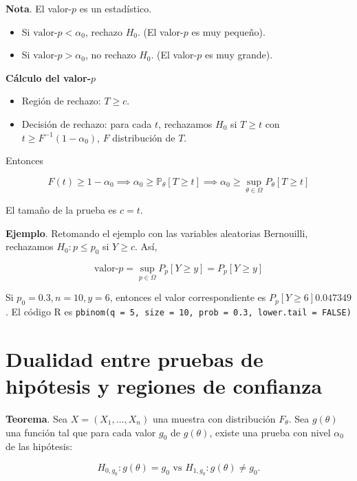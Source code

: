 \documentclass[
  12pt,
]{book}
\begin{document}
\textbf{Nota}. El valor-\(p\) es un estadístico.

\begin{itemize}
\item
  Si \(\text{valor-}p<\alpha_0\), rechazo \(H_0\). (El valor-\(p\) es muy pequeño).
\item
  Si \(\text{valor-}p>\alpha_0\), no rechazo \(H_0\). (El valor-\(p\) es muy grande).
\end{itemize}

\textbf{Cálculo del valor-\(p\)}

\begin{itemize}
\item
  Región de rechazo: \(T\geq c\).
\item
  Decisión de rechazo: para cada \(t\), rechazamos \(H_0\) si \(T\geq t\) con \(t\geq F^{-1}(1-\alpha_0)\), \(F\) distribución de \(T\).
\end{itemize}

Entonces

\[F(t) \geq 1-\alpha_0 \implies \alpha_0 \geq \mathbb P_\theta[T\geq t] \implies \alpha_0 \geq \sup_{\theta\in\Omega}P_{\theta}[T\geq t]\]

El tamaño de la prueba es \(c=t\).

\textbf{Ejemplo}. Retomando el ejemplo con las variables aleatorias Bernouilli,
rechazamos \(H_0: p\leq p_0\) si \(Y\geq c\). Así,

\[\text{valor-$p$} = \sup_{p\in\Omega}P_{p}[Y\geq y] =P_{p}[Y\geq y] \]

Si \(p_0 = 0.3, n=10, y =6\), entonces el valor correspondiente es \(P_{p}[Y\geq 6] 0.047349\). El código R es
\texttt{pbinom(q\ =\ 5,\ size\ =\ 10,\ prob\ =\ 0.3,\ lower.tail\ =\ FALSE)}

\hypertarget{dualidad-entre-pruebas-de-hipuxf3tesis-y-regiones-de-confianza}{%
\section{Dualidad entre pruebas de hipótesis y regiones de confianza}\label{dualidad-entre-pruebas-de-hipuxf3tesis-y-regiones-de-confianza}}

\textbf{Teorema}. Sea \(X = (X_1,\dots,X_n)\) una muestra con distribución \(F_\theta\).
Sea \(g(\theta)\) una función tal que para cada valor \(g_0\) de \(g(\theta)\), existe
una prueba con nivel \(\alpha_0\) de las hipótesis:

\[H_{0,g_0}: g(\theta) = g_0 \text{ vs } H_{1,g_0}: g(\theta) \neq g_0. \]
\end{document}
